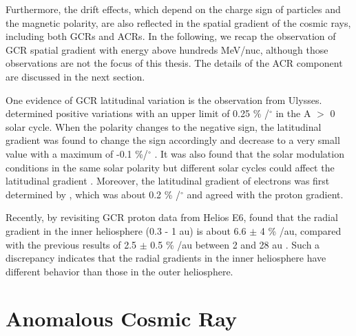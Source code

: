 Furthermore, the drift effects, which depend on the charge sign of particles and the magnetic polarity, are also reflected in the spatial gradient of the cosmic rays, including both \acp{GCR} and \acp{ACR}. In the following, we recap the observation of \ac{GCR} spatial gradient with energy above hundreds MeV/nuc, although those observations are not the focus of this thesis. The details of the \ac{ACR} component are discussed in the next section.

One evidence of \ac{GCR} latitudinal variation is the observation from Ulysses. \citet{Simpson1995GeoRL, Heber1996GeoRL, Heber1996AA} determined positive variations with an upper limit of 0.25 \% /$^\circ$  in the A $>$ 0 solar cycle. When the polarity changes to the negative sign, the latitudinal gradient was found to change the sign accordingly and decrease to a very small value with a maximum of -0.1 \%/$^\circ$ \citep{desimone2011ASTRA, Gieseler2016AA}. It was also found that the solar modulation conditions in the same solar polarity but different solar cycles could affect the latitudinal gradient \citep{Gieseler2016AA, Vos2016SoPh}. Moreover, the latitudinal gradient of electrons was first determined by \citet{Heber2008ApJ}, which was about 0.2 \% /$^\circ$ and agreed with the proton gradient.

Recently, by revisiting \ac{GCR} proton data from Helios E6, \citet{Marquardt2019AA} found that the radial gradient in the inner heliosphere (0.3 - 1 au) is about 6.6 $\pm$ 4 \% /au, compared with the previous results of 2.5 $\pm$ 0.5 \% /au between 2 and 28 au \citep{Webber1981JGR}. Such a discrepancy indicates that the radial gradients in the inner heliosphere have different behavior than those in the outer heliosphere.


\section{Anomalous Cosmic Ray}

